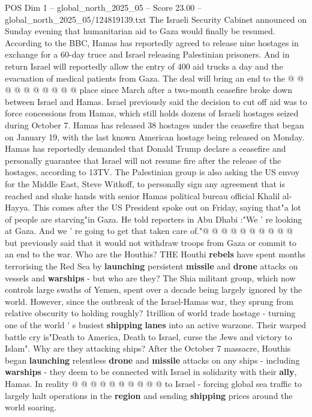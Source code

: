 \begin{textsample}{POS Dim 1 – global\_north\_2025\_05 – Score 23.00 – global\_north\_2025\_05/124819139.txt}
The Israeli Security Cabinet announced on Sunday evening that humanitarian aid to Gaza would finally be resumed.
According to the BBC, Hamas has reportedly agreed to release nine hostages in exchange for a 60-day truce and Israel releasing Palestinian prisoners.
And in return Israel will reportedly allow the entry of 400 aid trucks a day and the evacuation of medical patients from Gaza.
The deal will bring an end to the @ @ @ @ @ @ @ @ @ @ place since March after a two-month ceasefire broke down between Israel and Hamas.
Israel previously said the decision to cut off aid was to force concessions from Hamas, which still holds dozens of Israeli hostages seized during October 7.
Hamas has released 38 hostages under the ceasefire that began on January 19, with the last known American hostage being released on Monday.
Hamas has reportedly demanded that Donald Trump declare a ceasefire and personally guarantee that Israel will not resume fire after the release of the hostages, according to 13TV.
The Palestinian group is also asking the US envoy for the Middle East, Steve Witkoff, to personally sign any agreement that is reached and shake hands with senior Hamas political bureau official Khalil al-Hayya.
This comes after the US President spoke out on Friday, saying that"a lot of people are starving"in Gaza.
He told reporters in Abu Dhabi :"We ' re looking at Gaza.
And we ' re going to get that taken care of."@ @ @ @ @ @ @ @ @ @ but previously said that it would not withdraw troops from Gaza or commit to an end to the war.
Who are the Houthis?
THE Houthi \textbf{rebels} have spent months terrorising the Red Sea by \textbf{launching} persistent \textbf{missile} and \textbf{drone} attacks on vessels and \textbf{warships} - but who are they?
The Shia militant group, which now controls large swaths of Yemen, spent over a decade being largely ignored by the world.
However, since the outbreak of the Israel-Hamas war, they sprung from relative obscurity to holding roughly? 1trillion of world trade hostage - turning one of the world ' s busiest \textbf{shipping} \textbf{lanes} into an active warzone.
Their warped battle cry is"Death to America, Death to Israel, curse the Jews and victory to Islam".
Why are they attacking ships?
After the October 7 massacre, Houthis began \textbf{launching} relentless \textbf{drone} and \textbf{missile} attacks on any ships - including \textbf{warships} - they deem to be connected with Israel in solidarity with their \textbf{ally}, Hamas.
In reality @ @ @ @ @ @ @ @ @ @ to Israel - forcing global sea traffic to largely halt operations in the \textbf{region} and sending \textbf{shipping} prices around the world soaring.

\end{textsample}
